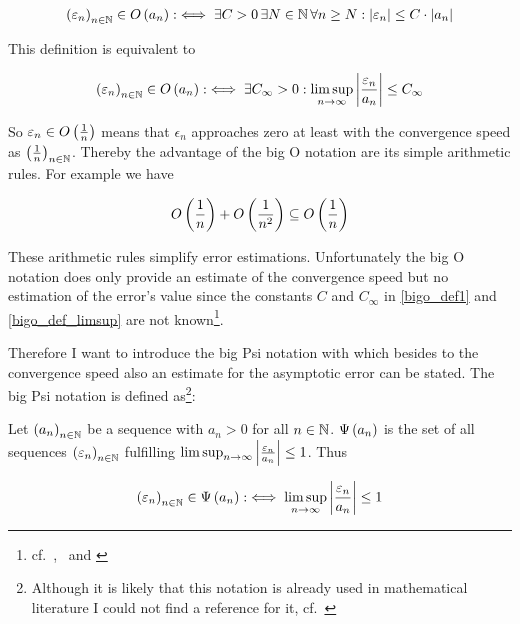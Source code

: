 \begin{align} \label{bigo_def1}
  \left({\varepsilon_n}\right)_{{n}\in\mathbb N} \in O\left( {a_n} \right) :\iff \exists C > 0\, \exists N\in\mathbb N\,\forall n\ge N: \left|{\varepsilon_n}\right| \le C \cdot \left|{a_n}\right|
\end{align}

\noindent This definition is equivalent to~\cite[p.~383]{hachenberger}\cite{wiki:bigo}

\begin{align} \label{bigo_def_limsup}
  \left({\varepsilon_n}\right)_{{n}\in\mathbb N} \in O\left( {a_n} \right) :\iff \exists C_\infty > 0: \limsup_{n\to\infty} \left|{\frac{\varepsilon_n}{a_n}}\right| \le C_\infty
\end{align}

So $\varepsilon_n \in O\left( {\frac 1n} \right)$ means that $\epsilon_n$ approaches zero at least with the convergence speed as $\left({\frac 1n}\right)_{{n}\in\mathbb N}$. Thereby the advantage of the big O notation are its simple arithmetic rules. For example we have

\begin{align}
  O\left( {\frac 1n} \right) + O\left( {\frac 1{n^2}} \right) \subseteq O\left( {\frac 1n} \right)
\end{align}

These arithmetic rules simplify error estimations. Unfortunately the big O notation does only provide an estimate of the convergence speed but no estimation of the error's value since the constants $C$ and $C_\infty$ in \eqref{bigo_def1} and \eqref{bigo_def_limsup} are not known\footnote{cf.~\cite[p.~444]{graham},~\cite{hurkyl_bigo} and \cite{templatetypedef_bigo}}.

Therefore I want to introduce the big Psi notation with which besides to the convergence speed also an estimate for the asymptotic error can be stated. The big Psi notation is defined as\footnote{Although it is likely that this notation is already used in mathematical literature I could not find a reference for it, cf.~\cite{tampis_bigpsi}}:

\begin{definition}
  Let $\left({a_n}\right)_{{n}\in\mathbb N}$ be a sequence with $a_n > 0$ for all $n\in\mathbb N$. $\Psi\left( {a_n} \right)$ is the set of all sequences $\left({\varepsilon_n}\right)_{{n}\in\mathbb N}$ fulfilling $\limsup_{n\to\infty} \left|{\frac{\varepsilon_n}{a_n}}\right| \le 1$. Thus

  \begin{align}
    \left({\varepsilon_n}\right)_{{n}\in\mathbb N} \in \Psi\left( {a_n} \right) :\iff \limsup_{n\to\infty} \left|{\frac{\varepsilon_n}{a_n}}\right| \le 1
  \end{align}

\end{definition}

